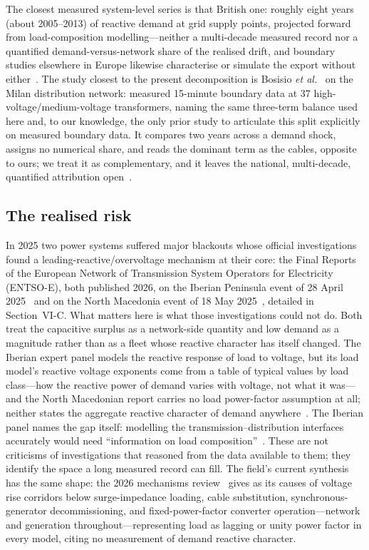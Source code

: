 \documentclass[journal]{IEEEtran}
\begin{document}
The closest measured system-level series is that British one: roughly eight years
(about 2005--2013) of reactive demand at grid supply points, projected forward
from load-composition modelling---neither a multi-decade measured record nor a
quantified demand-versus-network share of the realised drift, and boundary studies
elsewhere in Europe likewise characterise or simulate the export without
either~\cite{tazky2021,hume_extended}. The study closest to the present decomposition is Bosisio
\emph{et al.}~\cite{bosisio2022} on the Milan distribution network: measured
15-minute boundary data at 37 high-voltage/medium-voltage transformers, naming the
same three-term balance used here and, to our knowledge, the only prior study to
articulate this split explicitly on measured boundary data. It compares two years
across a demand shock, assigns no numerical share, and reads the dominant term as
the cables, opposite to ours; we treat it as complementary, and it leaves the
national, multi-decade, quantified attribution open~\cite{hume_extended}.

\subsection{The realised risk}
In 2025 two power systems suffered major blackouts whose official investigations
found a leading-reactive/overvoltage mechanism at their core: the Final Reports
of the European Network of Transmission System Operators for Electricity
(ENTSO-E), both published 2026, on the Iberian Peninsula event of 28 April
2025~\cite{entsoe_iberia} and on the North Macedonia event of 18 May
2025~\cite{entsoe_nm}, detailed in Section~VI-C. What matters here is what those
investigations could not do. Both treat the capacitive surplus as a network-side
quantity and low demand as a magnitude rather than as a fleet whose reactive
character has itself changed. The Iberian expert panel models the reactive response of load to voltage, but its load model's reactive voltage exponents come from a
table of typical values by load class---how the reactive power of demand varies
with voltage, not what it was---and the North Macedonian report carries no load
power-factor assumption at all; neither states the aggregate reactive character of demand anywhere~\cite{hume_extended}. The Iberian panel names the gap itself: modelling the transmission--distribution interfaces accurately would need ``information on load composition''~\cite{entsoe_iberia}. These are not criticisms of investigations that reasoned from
the data available to them; they identify the space a long measured record can
fill. The field's current synthesis has the same shape: the 2026 mechanisms
review~\cite{vournas2026review} gives as its causes of voltage rise corridors
below surge-impedance loading, cable substitution, synchronous-generator
decommissioning, and fixed-power-factor converter operation---network and
generation throughout---representing load as lagging or unity power factor in
every model, citing no measurement of demand reactive character.
\end{document}
